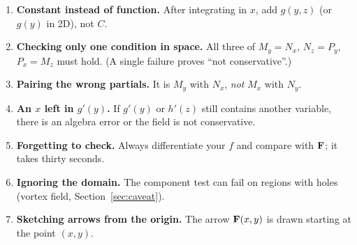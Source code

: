 \begin{enumerate}
\item \textbf{Constant instead of function.} After integrating in $x$, add
      $g(y,z)$ (or $g(y)$ in 2D), not $C$.
\item \textbf{Checking only one condition in space.} All three of $M_y=N_x$,
      $N_z=P_y$, $P_x=M_z$ must hold. (A single failure proves ``not
      conservative''.)
\item \textbf{Pairing the wrong partials.} It is $M_y$ with $N_x$, \emph{not}
      $M_x$ with $N_y$.
\item \textbf{An $x$ left in $g'(y)$.} If $g'(y)$ or $h'(z)$ still contains another
      variable, there is an algebra error or the field is not conservative.
\item \textbf{Forgetting to check.} Always differentiate your $f$ and compare with
      $\mathbf{F}$; it takes thirty seconds.
\item \textbf{Ignoring the domain.} The component test can fail on regions with
      holes (vortex field, Section~\ref{sec:caveat}).
\item \textbf{Sketching arrows from the origin.} The arrow $\mathbf{F}(x,y)$ is drawn
      starting at the point $(x,y)$.
\end{enumerate}
